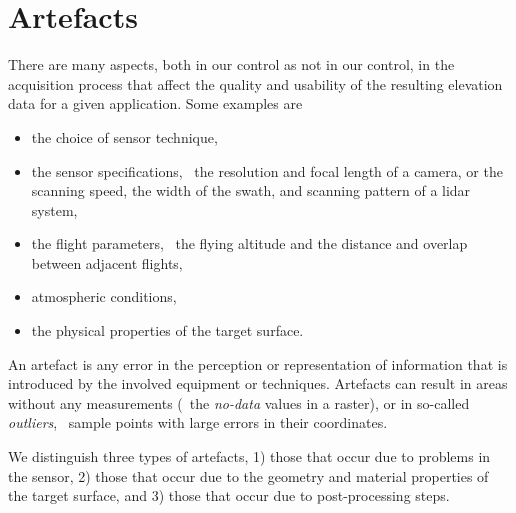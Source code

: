 \section{Artefacts}
\label{sec:artefacts}
There are many aspects, both in our control as not in our control, in the acquisition process that affect the quality and usability of the resulting elevation data for a given application. Some examples are
\begin{itemize}
	\item the choice of sensor technique, 
	\item the sensor specifications, \eg\ the resolution and focal length of a camera, or the scanning speed, the width of the swath, and scanning pattern of a lidar system,
	\item the flight parameters, \eg\ the flying altitude and the distance and overlap between adjacent flights,
	\item atmospheric conditions, 
	\item the physical properties of the target surface.
\end{itemize}

An artefact is any error in the perception or representation of information that is introduced by the involved equipment or techniques. 
Artefacts can result in areas without any measurements (\eg\ the \emph{no-data} values in a raster), or in so-called \emph{outliers}, \ie\ sample points with large errors in their coordinates. 

We distinguish three types of artefacts, 1) those that occur due to problems in the sensor, 2) those that occur due to the geometry and material properties of the target surface, and 3) those that occur due to post-processing steps.


